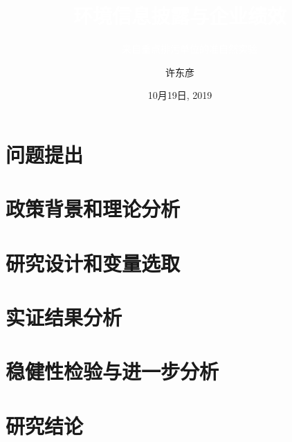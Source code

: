 \documentclass{beamer}	%
\title{\textcolor{white}{环境信息披露与企业绩效}}
\subtitle{\textcolor{white}{——来自重点排污单位的准自然实验}}
\author{许东彦}
\institute{东北财经大学经济学院}
\date{10月19日, 2019}
\theoremstyle{plain}
\theoremstyle{definition}
\theoremstyle{remark}
\numberwithin{equation}{section}
\begin{document}
\begin{frame}
\titlepage
\end{frame}

\begin{frame}           %
\tableofcontents        %
\end{frame}
\section{问题提出}
\begin{frame}
\end{frame}
\section{政策背景和理论分析}
\begin{frame}
\end{frame}
\section{研究设计和变量选取}
\begin{frame}
\end{frame}

\section{实证结果分析}
\begin{frame}
\end{frame}
\section{稳健性检验与进一步分析}
\begin{frame}
\end{frame}

\section{研究结论}
\begin{frame}
\end{frame}
\end{document}
